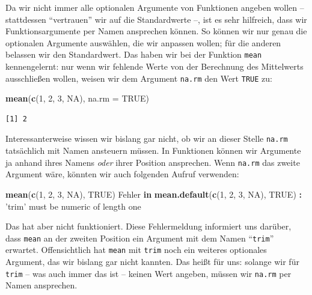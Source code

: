 \documentclass[12pt,]{tufte-book}
\newenvironment{Shaded}{\begin{snugshade}}{\end{snugshade}}
\newcommand{\KeywordTok}[1]{\textcolor[rgb]{0.13,0.29,0.53}{\textbf{#1}}}
\newcommand{\DataTypeTok}[1]{\textcolor[rgb]{0.13,0.29,0.53}{#1}}
\newcommand{\DecValTok}[1]{\textcolor[rgb]{0.00,0.00,0.81}{#1}}
\newcommand{\StringTok}[1]{\textcolor[rgb]{0.31,0.60,0.02}{#1}}
\newcommand{\OtherTok}[1]{\textcolor[rgb]{0.56,0.35,0.01}{#1}}
\newcommand{\ControlFlowTok}[1]{\textcolor[rgb]{0.13,0.29,0.53}{\textbf{#1}}}
\newcommand{\OperatorTok}[1]{\textcolor[rgb]{0.81,0.36,0.00}{\textbf{#1}}}
\newcommand{\NormalTok}[1]{#1}
\theoremstyle{definition}
\theoremstyle{definition}
\theoremstyle{definition}
\theoremstyle{remark}
\begin{document}
Da wir nicht immer alle optionalen Argumente von Funktionen angeben
wollen -- stattdessen ``vertrauen'' wir auf die Standardwerte --, ist es
sehr hilfreich, dass wir Funktionsargumente per Namen ansprechen können.
So können wir nur genau die optionalen Argumente auswählen, die wir
anpassen wollen; für die anderen belassen wir den Standardwert. Das
haben wir bei der Funktion \texttt{mean} kennengelernt: nur wenn wir
fehlende Werte von der Berechnung des Mittelwerts ausschließen wollen,
weisen wir dem Argument \texttt{na.rm} den Wert \texttt{TRUE} zu:

\begin{Shaded}
\begin{Highlighting}[]
\KeywordTok{mean}\NormalTok{(}\KeywordTok{c}\NormalTok{(}\DecValTok{1}\NormalTok{, }\DecValTok{2}\NormalTok{, }\DecValTok{3}\NormalTok{, }\OtherTok{NA}\NormalTok{), }\DataTypeTok{na.rm =} \OtherTok{TRUE}\NormalTok{)}
\end{Highlighting}
\end{Shaded}

\begin{verbatim}
[1] 2
\end{verbatim}

Interessanterweise wissen wir bislang gar nicht, ob wir an dieser Stelle
\texttt{na.rm} tatsächlich mit Namen ansteuern müssen. In Funktionen
können wir Argumente ja anhand ihres Namens \emph{oder} ihrer Position
ansprechen. Wenn \texttt{na.rm} das zweite Argument wäre, könnten wir
auch folgenden Aufruf verwenden:

\begin{Shaded}
\begin{Highlighting}[]
\KeywordTok{mean}\NormalTok{(}\KeywordTok{c}\NormalTok{(}\DecValTok{1}\NormalTok{, }\DecValTok{2}\NormalTok{, }\DecValTok{3}\NormalTok{, }\OtherTok{NA}\NormalTok{), }\OtherTok{TRUE}\NormalTok{)}
\NormalTok{Fehler }\ControlFlowTok{in} \KeywordTok{mean.default}\NormalTok{(}\KeywordTok{c}\NormalTok{(}\DecValTok{1}\NormalTok{, }\DecValTok{2}\NormalTok{, }\DecValTok{3}\NormalTok{, }\OtherTok{NA}\NormalTok{), }\OtherTok{TRUE}\NormalTok{) }\OperatorTok{:}\StringTok{ }
\StringTok{  'trim'}\NormalTok{ must be numeric of length one}
\end{Highlighting}
\end{Shaded}

Das hat aber nicht funktioniert. Diese Fehlermeldung informiert uns
darüber, dass \texttt{mean} an der zweiten Position ein Argument mit dem
Namen ``\texttt{trim}'' erwartet. Offensichtlich hat \texttt{mean} mit
\texttt{trim} noch ein weiteres optionales Argument, das wir bislang gar
nicht kannten. Das heißt für uns: solange wir für \texttt{trim} -- was
auch immer das ist -- keinen Wert angeben, müssen wir \texttt{na.rm} per
Namen ansprechen.
\end{document}
